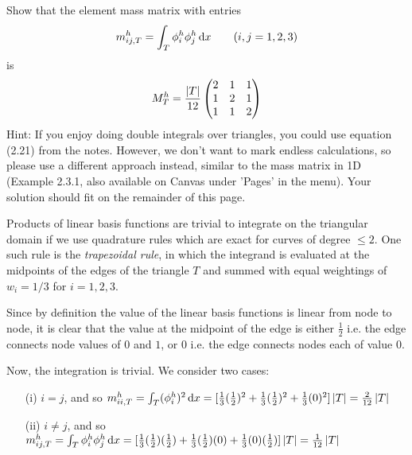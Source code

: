 \begin{problem}{1}
\begin{itemize}
    Show that the element mass matrix with entries
    \begin{align*}
	m_{ij,T}^h = \int_T \phi_i^h \phi_j^h \operatorname{d}\!{x} \qquad (i,j = 1,2,3)
	\end{align*}
	is
	\begin{align*}
	M_T^h = \frac{\left| T \right|}{12}
	\begin{pmatrix}
	2 & 1 & 1 \\ 
	1 & 2 & 1 \\ 
	1 & 1 & 2
	\end{pmatrix}
	\end{align*}
	Hint: If you enjoy doing double integrals over triangles,
	you could use equation (2.21) from the notes. However,
	we don't want to mark endless calculations, so please use a
	different approach instead, similar to the mass
	matrix in 1D (Example 2.3.1, also available on Canvas under
	'Pages' in the menu).
	Your solution should fit on the remainder of this page.
	    
\end{itemize}

\begin{solution}
Products of linear basis functions are trivial to integrate on the
triangular domain if we use quadrature rules which are exact for
curves of degree $\leq 2$. One such rule is the
\textit{trapezoidal rule},
in which the integrand is evaluated at the midpoints of the edges
of the triangle $T$ and summed with 
equal weightings of $w_i = 1/3$ for $i=1,2,3$.

Since by definition the value of the linear basis functions
is linear from node to node, it is clear that the value at the
midpoint of the edge
is either $\frac{1}{2}$ i.e. the edge connects node values of
$0$ and $1$, or $0$ i.e. the edge
connects nodes each of value $0$.

Now, the integration is trivial. We consider two cases:
\begin{itemize}
\item[(i)] $i=j$, and so
$m_{ii,T}^h = \int_T (\phi_i^h)^2 \operatorname{d}\!{x} = 
[ \frac{1}{3} (\frac{1}{2})^2 +
\frac{1}{3} (\frac{1}{2})^2 +
\frac{1}{3} (0)^2 ] \left| T \right| = \frac{2}{12} \left| T \right| $
\item[(ii)] $i\neq j$, and so
$m_{ij,T}^h = \int_T \phi_i^h \phi_j^h \operatorname{d}\!{x} = 
[ \frac{1}{3} (\frac{1}{2})(\frac{1}{2}) +
\frac{1}{3} (\frac{1}{2})(0) +
\frac{1}{3} (0)(\frac{1}{2}) ] \left| T \right| = \frac{1}{12} \left| T \right| $
\end{itemize}


\end{solution}
\end{problem}
